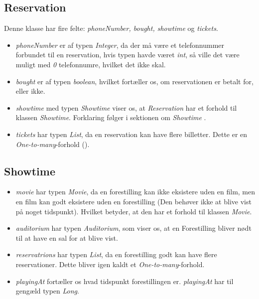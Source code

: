 \subsection{Reservation}

Denne klasse har fire felte: \textit{phoneNumber, bought, showtime} og \textit{tickets}.

\begin{itemize}
  \item \textit{phoneNumber} er af typen \textit{Integer}, da der må være et telefonnummer forbundet til en reservation, hvis typen havde været \textit{int}, så ville det være muligt med \textit{0} telefonnumre, hvilket det ikke skal.
  \item \textit{bought} er af typen \textit{boolean}, hvilket fortæller os, om reservationen er betalt for, eller ikke. 
  \item \textit{showtime} med typen \textit{Showtime} viser os, at \textit{Reservation} har et forhold til klassen \textit{Showtime}. Forklaring følger i sektionen om \textit{Showtime} .
  \item \textit{tickets} har typen \textit{List}, da en reservation kan have flere billetter. Dette er en \textit{One-to-many}-forhold (\cite{https://learnit.itu.dk/pluginfile.php/114939/mod_resource/content/0/GRPRO-14.pdf}).

\end{itemize}

\subsection{Showtime}

\begin{itemize}
  \item \textit{movie} har typen \textit{Movie}, da en forestilling kan ikke eksistere uden en film, men en film kan godt eksistere uden en forestilling (Den behøver ikke at blive vist på noget tidspunkt). Hvilket betyder, at den har et forhold til klassen \textit{Movie}.
  \item \textit{auditorium} har typen \textit{Auditorium}, som viser os, at en Forestilling bliver nødt til at have en sal for at blive vist. 
  \item \textit{reservatrions} har typen \textit{List}, da en forestilling godt kan have flere reservationer. Dette bliver igen kaldt et \textit{One-to-many}-forhold.
  \item \textit{playingAt} fortæller os hvad tidspunkt forestillingen er. \textit{playingAt} har til gengæld typen \textit{Long}. 
\end{itemize}

